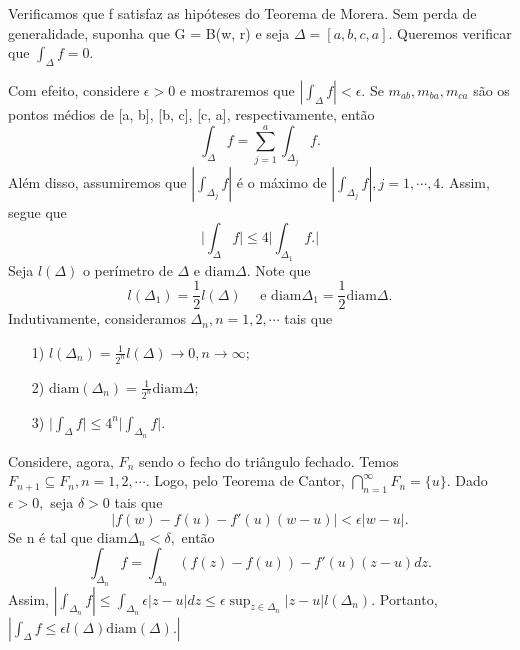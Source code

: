 \documentclass[complex.tex]{subfiles}
\begin{document}
\begin{proof*}
	Verificamos que f satisfaz as hipóteses do Teorema de Morera.
	Sem perda de generalidade, suponha que G = B(w, r) e seja $\Delta=[a, b, c, a].$
	Queremos verificar que $\int_{\Delta}^{}f = 0.$

	Com efeito, considere $\epsilon > 0$ e mostraremos que $|\int_{\Delta}^{}f| < \epsilon.$ Se
	$m_{ab}, m_{ba}, m_{ca}$ são os pontos médios de [a, b], [b, c], [c, a], respectivamente,
	então
	$$
		\int_{\Delta}^{}f = \sum\limits_{j=1}^{a}\int_{\Delta_{j}}^{}f.
	$$
	Além disso, assumiremos que $|\int_{\Delta_j}^{}f|$ é o máximo de
	$|\int_{\Delta_{j}}^{}f|, j = 1, \cdots, 4$. Assim, segue que
	$$
		\biggl|\int_{\Delta}^{}f\biggr|\leq4 \biggl|\int_{\Delta_{1}}^{}f.\biggr|
	$$
	Seja $l(\Delta)$ o perímetro de $\Delta$ e $\mathrm{diam} \Delta$. Note que
	$$
		l(\Delta_{1}) = \frac{1}{2}l(\Delta)\quad\text{ e } \mathrm{diam} \Delta_{1} = \frac{1}{2}\mathrm{diam }\Delta.
	$$
	Indutivamente, consideramos $\Delta_{n}, n = 1, 2, \cdots$ tais que
	\begin{itemize}
		\item[1)] $l(\Delta_{n}) = \frac{1}{2^n}l(\Delta)\to0, n\to\infty;$
		\item[2)] $\mathrm{diam}(\Delta_{n}) = \frac{1}{2^n}\mathrm{diam} \Delta;$
		\item[3)] $\biggl|\int_{\Delta}^{}f\biggr|\leq 4^n\biggl|\int_{\Delta_{n}}^{}f\biggr|.$
	\end{itemize}
	Considere, agora, $F_{n}$ sendo o fecho do triângulo fechado. Temos
	$F_{n+1}\subseteq{F_{n}}, n=1, 2, \cdots.$ Logo, pelo Teorema de Cantor, $\bigcap_{n=1}^{\infty}F_{n}=\{u\}. $
	Dado $\epsilon > 0,$ seja $\delta > 0$ tais que
	$$
		|f(w) - f(u) - f'(u)(w-u)| < \epsilon|w-u|.
	$$
	Se n é tal que $\mathrm{diam} \Delta_{n} < \delta,$ então
	$$
		\int_{\Delta_{n}}^{}f = \int_{\Delta_{n}}^{}(f(z) - f(u)) - f'(u)(z-u)dz.
	$$
	Assim, $|\int_{\Delta_{n}}^{}f|\leq \int_{\Delta_{n}}^{}\epsilon|z-u|dz\leq \epsilon\sup_{z\in{\Delta_{n}}}|z-u|l(\Delta_{n}).$
	Portanto, $|\int_{\Delta}^{}f \leq \epsilon l(\Delta) \mathrm{diam}(\Delta).|$ \qedsymbol
\end{proof*}
\end{document}
